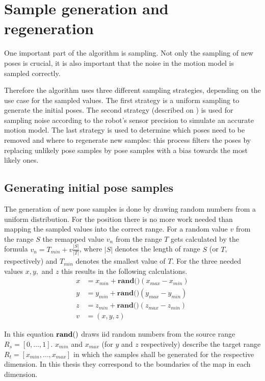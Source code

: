 \documentclass[Thesis.tex]{subfiles}
\begin{document}
\section{Sample generation and regeneration}

One important part of the algorithm is sampling. Not only the sampling of new poses is crucial, it is also important that the noise in the motion model is sampled correctly. 

Therefore the algorithm uses three different sampling strategies, depending on the use case for the sampled values. The first strategy is a uniform sampling to generate the initial poses. The second strategy (described on ) is used for sampling noise according to the robot's sensor precision to simulate an accurate motion model. The last strategy is used to determine which poses need to be removed and where to regenerate new samples: this process filters the poses by replacing unlikely pose samples by pose samples with a bias towards the most likely ones.

\subsection{Generating initial pose samples}\label{sec:init_samples}
The generation of new pose samples is done by drawing random numbers from a uniform distribution. For the position there is no more work needed than mapping the sampled values into the correct range. For a random value $v$ from the range $S$ the remapped value $v_n$ from the range $T$ gets calculated by the formula $v_n = T_{min} + v \frac{|S|}{|T|}$, where $|S|$ denotes the length of range $S$ (or $T$, respectively) and $T_{min}$ denotes the smallest value of $T$. For the three needed values $x, y,$ and $z$ this results in the following calculations.
%
\begin{align}
x &= x_{min} + \textbf{rand()} \left( x_{max} - x_{min} \right) \\
y &= y_{min} + \textbf{rand()} \left( y_{max} - y_{min} \right) \\
z &= z_{min} + \textbf{rand()} \left( z_{max} - z_{min} \right) \\
v &= (x, y, z)
\end{align}

In this equation ${\bf rand()}$ draws \gls{iid} random numbers from the source range $R_s = \left[0, \dots, 1\right]$. $x_{min}$ and $x_{max}$ (for $y$ and $z$ respectively) describe the target range $R_t = \left[x_{min}, \dots, x_{max}\right]$ in which the samples shall be generated for the respective dimension. In this thesis they correspond to the boundaries of the map in each dimension.
\end{document}
